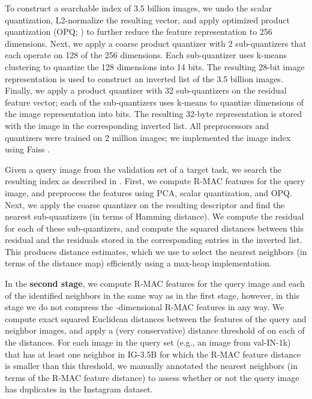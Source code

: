 \documentclass[runningheads]{llncs}
\makeatletter
\newcommand{\eg}{e.g.\@\xspace}
\makeatother
\begin{document}
To construct a searchable index of 3.5 billion images, we undo the scalar quantization, L2-normalize the resulting vector, and apply optimized product quantization (OPQ; \cite{ge2013opq}) to further reduce the feature representation to 256 dimensions. Next, we apply a coarse product quantizer \cite{jegou2011pq} with 2 sub-quantizers that each operate on 128 of the 256 dimensions. Each sub-quantizer uses k-means clustering to quantize the 128 dimensions into 14 bits. The resulting 28-bit image representation is used to construct an inverted list of the 3.5 billion images. Finally, we apply a product quantizer with 32 sub-quantizers on the residual feature vector; each of the sub-quantizers uses k-means to quantize  dimensions of the image representation into  bits. The resulting 32-byte representation is stored with the image in the corresponding inverted list. All preprocessors and quantizers were trained on 2 million images; we implemented the image index using Faiss \cite{johnson2017billion}.

Given a query image from the validation set of a target task, we search the resulting index as described in \cite{jegou2011pq}. First, we compute R-MAC features for the query image, and preprocess the features using PCA, scalar quantization, and OPQ. Next, we apply the coarse quantizer on the resulting descriptor and find the  nearest sub-quantizers (in terms of Hamming distance). We compute the residual for each of these sub-quantizers, and compute the squared distances between this residual and the residuals stored in the corresponding entries in the inverted list. This produces distance estimates, which we use to select the  nearest neighbors (in terms of the distance map) efficiently using a max-heap implementation.

In the \textbf{second stage}, we compute R-MAC features for the query image and each of the  identified neighbors in the same way as in the first stage, however, in this stage we do not compress the -dimensional R-MAC features in any way. We compute exact squared Euclidean distances between the features of the query and neighbor images, and apply a (very conservative) distance threshold of  on each of the distances. For each image in the query set (\eg, an image from val-IN-1k) that has at least one neighbor in IG-3.5B for which the R-MAC feature distance is smaller than this threshold, we manually annotated the  nearest neighbors (in terms of the R-MAC feature distance) to assess whether or not the query image has duplicates in the Instagram dataset. 
\end{document}
